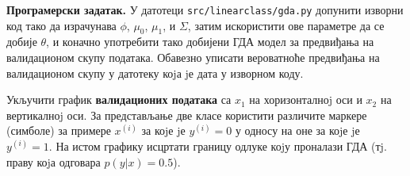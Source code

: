 \item {} \textbf{Програмерски задатак.}
У датотеци \texttt{src/linearclass/gda.py} допунити изворни код тако да израчунава $\phi$, $\mu_{0}$, $\mu_{1}$, и $\Sigma$, затим искористити ове параметре да се добије $\theta$, и коначно употребити тако добијени ГДА модел за предвиђања на валидационом скупу података. Обавезно уписати вероватноће предвиђања на валидационом скупу у датотеку коjа jе дата у изворном коду.

Укључити график \textbf{валидационих података} са $x_1$ на хоризонталноj оси и $x_2$ на вертикалноj оси. За представљање две класе користити различите маркере (симболе)
за примере $x^{(i)}$ за коjе jе $y^{(i)} = 0$ у односу на оне за коjе jе $y^{(i)} = 1$. На истом графику исцртати границу одлуке коjу проналази ГДА (тj. праву коjа одговара $p(y|x) = 0.5$).

